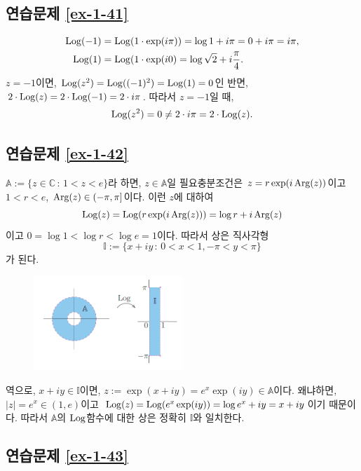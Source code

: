 \subsection*{연습문제 \ref{ex-1-41}}

\begin{align*}
\mathop{\mathrm{Log}}(-1) &= \mathop{\mathrm{Log}}(1\cdot \exp(i\pi)) = \log1 +i\pi = 0 + i\pi = i\pi, \\
\mathop{\mathrm{Log}}(1) &= \mathop{\mathrm{Log}}(1\cdot \exp(i0) = \log\sqrt{2} + i \displaystyle\frac\pi4.
\end{align*}
$z=-1$이면,
$\mathop{\mathrm{Log}}(z^2) = \mathop{\mathrm{Log}}((-1)^2) = \mathop{\mathrm{Log}}(1) = 0$인 반면,
$2\cdot\mathop{\mathrm{Log}}(z) = 2\cdot \mathop{\mathrm{Log}}(-1) = 2\cdot i\pi$. 
따라서 $z=-1$일 때,
\[
\mathop{\mathrm{Log}}(z^2) = 0 \ne 2\cdot i\pi = 2\cdot \mathop{\mathrm{Log}}(z).
\]

\subsection*{연습문제 \ref{ex-1-42}}

$\mathbb A:= \{ z \in \mathbb C \,:\, 1 < z < e \}$라 하면,
$z\in \mathbb A$일 필요충분조건은 $ z=r\exp(i\mathop{\mathrm{Arg}}(z))$이고
$1<r<e$, $\mathop{\mathrm{Arg}}(z)\in (-\pi,\pi]$이다.
이런 $z$에 대하여
\[
\mathop{\mathrm{Log}}(z) = \mathop{\mathrm{Log}}(r\exp(i\mathop{\mathrm{Arg}}(z))) = \log r + i\mathop{\mathrm{Arg}}(z)
\]
이고 $0=\log 1 < \log r < \log e = 1$이다.
따라서 상은 직사각형
\[
\mathbb I := \{ x+iy\,:\, 0<x<1, -\pi <y<\pi \}
\]
가 된다.

\begin{figure}[h!]
\begin{center}
\includegraphics[width=0.5\textwidth]{./Solution/figs/fig-s-0-5}
\end{center}
\end{figure}

역으로, $x+iy\in\mathbb I$이면,
$z:= \exp(x+iy) = e^x\exp(iy)\in \mathbb A$이다.
왜냐하면, $|z|=e^x \in (1,e)$이고 
$\mathop{\mathrm{Log}}(z) = \mathop{\mathrm{Log}} (e^x \exp(iy)) = \log e^x + iy = x+iy$이기 때문이다.
따라서 $\mathbb A$의 $\mathop{\mathrm{Log}}$함수에 대한 상은 정확히 $\mathbb I$와 일치한다.

\subsection*{연습문제 \ref{ex-1-43}}

